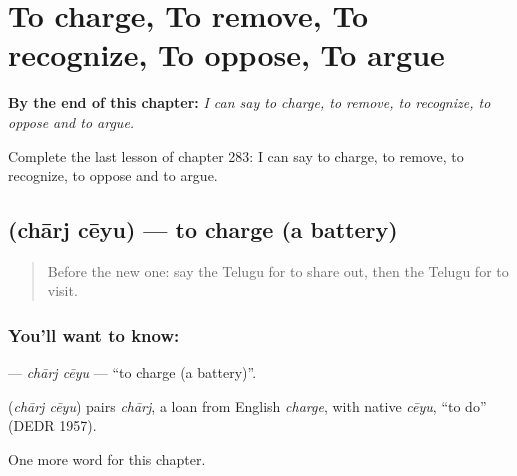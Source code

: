 
\chapter{To charge, To remove, To recognize, To oppose, To argue}
\label{ch:te-to-charge-to-remove-to-recognize-to-oppose-to-argue}

\begin{chapteropening}
\textbf{By the end of this chapter:} \emph{I can say to charge, to remove, to recognize, to oppose and to argue.}

Complete the last lesson of chapter 283: I can say to charge, to remove, to recognize, to oppose and to argue.
\end{chapteropening}

\section[\texorpdfstring{\te{ఛార్జ్} \te{చేయు} (chārj cēyu)}{ఛార్జ్ చేయు (chārj cēyu)}]{  (chārj cēyu) — to charge (a battery)}

\label{lesson:TE-C283-charj-ceyu}



\begin{quote}
Before the new one: say the Telugu for to share out, then the Telugu for to visit.
\end{quote}

\subsection*{You'll want to know:  }
\textbf{ } — \emph{chārj cēyu} — \textquotedblleft{}to charge (a battery)\textquotedblright{}.

\begin{cousinweb}
\textbf{ } (\emph{chārj cēyu}) pairs \emph{chārj}, a loan from English \emph{charge}, with native \emph{cēyu}, \textquotedblleft{}to do\textquotedblright{} (DEDR 1957).
\end{cousinweb}

\begin{grammarlens}[title={What you've built}]
One more word for this chapter.
\end{grammarlens}

